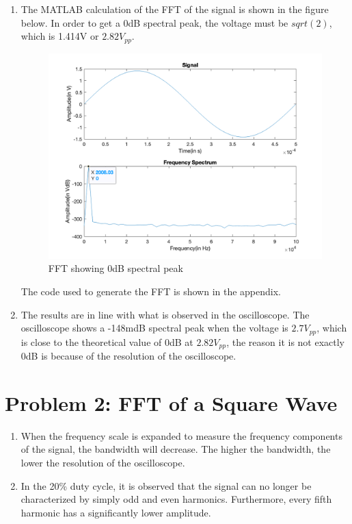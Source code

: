 \begin{enumerate}
    \item The MATLAB calculation of the FFT of the signal is shown in the figure below. In order to get a 0dB spectral peak, the voltage must be $sqrt(2)$, which is 1.414V or $2.82V_{pp}$.
          \begin{figure}[H]
              \centering
              \includegraphics[width=0.75\linewidth]{images/evaluation_problem3.png}
              \caption{FFT showing 0dB spectral peak}
              \label{fig:fft_0dB_spectral_peak}
          \end{figure}
          The code used to generate the FFT is shown in the appendix.
    \item The results are in line with what is observed in the oscilloscope. The oscilloscope shows a -148mdB spectral peak when the voltage is $2.7V_{pp}$, which is close to the theoretical value of 0dB at $2.82V_{pp}$, the reason it is not exactly 0dB is because of the resolution of the oscilloscope.
\end{enumerate}

\section{Problem 2: FFT of a Square Wave}
\begin{enumerate}
    \item When the frequency scale is expanded to measure the frequency components of the signal, the bandwidth will decrease. The higher the bandwidth, the lower the resolution of the oscilloscope.
    \item In the 20\% duty cycle, it is observed that the signal can no longer be characterized by simply odd and even harmonics. Furthermore, every fifth harmonic has a significantly lower amplitude.
\end{enumerate}

